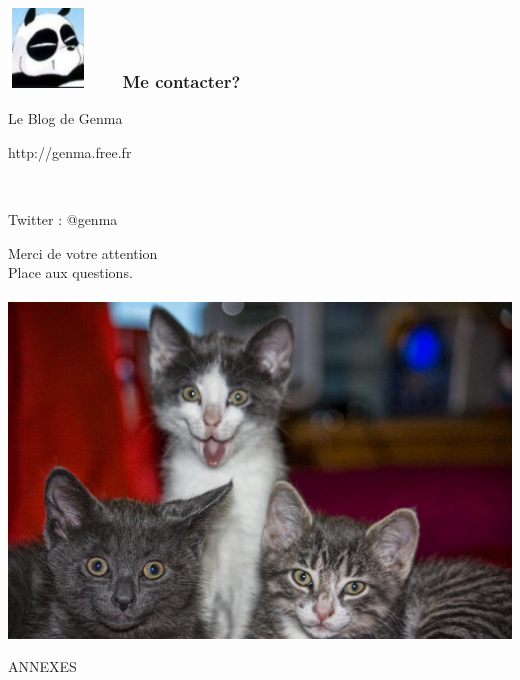 \documentclass{beamer}
\begin{document}
\begin{frame}
\frametitle{\includegraphics[scale=0.4]{./images/Genma.jpg} \ \ \  Me contacter?}
\Huge{\centerline{Le Blog de Genma}}
\Huge{\centerline{http://genma.free.fr}}
\Huge{\centerline{~}}
\Huge{\centerline{Twitter : @genma}}
\end{frame}

\begin{frame}
\begin{center}
\Huge{Merci de votre attention}
\\
\Huge{Place aux questions.}
\\~\\
\includegraphics[scale=0.2] {./images/chat.jpg}
\end{center}
\end{frame}

\begin{frame}
\Huge{\centerline{ANNEXES}}
\end{frame}
\end{document}
